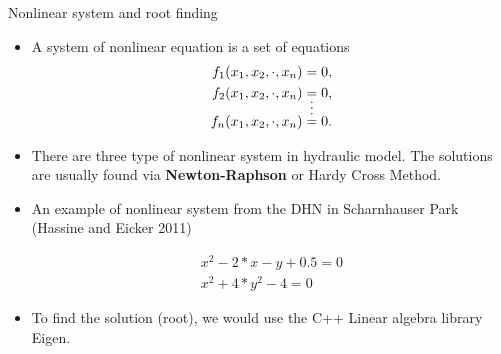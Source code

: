 \documentclass[xcolor=dvipsnames]{beamer}
\begin{document}
\begin{frame}{Nonlinear system and root finding}

\begin{itemize}
	\item A system of nonlinear equation is a set of equations 
	\begin{align*}
		f_1(x_1,x_2,\cdot,x_n)&=0,\\
		f_2(x_1,x_2,\cdot,x_n)&=0,\\
		&\shortvdotswithin{=}
		f_n(x_1,x_2,\cdot,x_n)&=0.
	\end{align*}
	\item There are three type of nonlinear system in hydraulic model. The solutions are usually found via 
	\textbf{Newton-Raphson} or Hardy Cross Method.

	\item An example of nonlinear system from the DHN in Scharnhauser Park (Hassine and Eicker 2011)

	\begin{align*}
		x^2-2*x-y+0.5=0\\
		x^2+4*y^2-4=0
	\end{align*}

	\item To find the solution (root), we would use the C++ Linear algebra library {\color{purple}Eigen}.  %

\end{itemize}
\end{frame}
\end{document}

